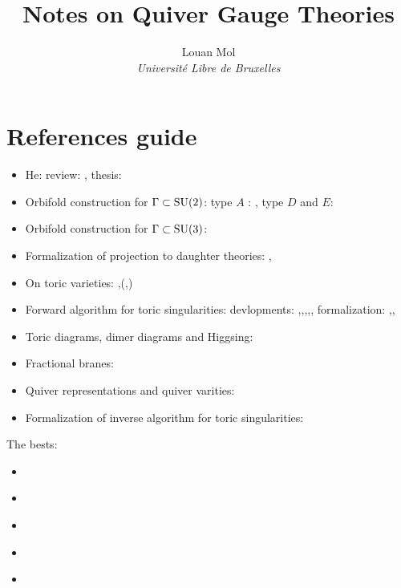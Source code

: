 \documentclass[a4paper,10pt]{article}
\title{\textbf{Notes on Quiver Gauge Theories}}
\author{Louan Mol\\ \textit{Université Libre de Bruxelles}}
\date{}
\begin{document}

  
\pagebreak

\tableofcontents

\pagebreak

\nocite{*}









\pagebreak
\appendix



\section{References guide}

\begin{itemize}
    \item He: review: \cite{he2004lectures}, thesis: \cite{masterHe}
    \item Orbifold construction for $\Gamma\subset\text{SU}(2)$: type $A$ : \cite{douglas1996dbranes}, type $D$ and $E$: \cite{PhysRevD.55.6382}
    \item Orbifold construction for $\Gamma\subset\text{SU}(3)$:\cite{Hanany_1999}
    \item Formalization of projection to daughter theories: \cite{vafa1998},\cite{silervstein1998}
    \item On toric varieties: \cite{cox2011toric},\cite{torigeomandCY}(\cite{fulton1993introduction},\cite{oda1988convex})
    \item Forward algorithm  for toric singularities: devlopments: \cite{FA1},\cite{FA2},\cite{FA3},\cite{FA4},\cite{FA5}, formalization: \cite{FA6},\cite{FA7},\cite{FA8}
    \item Toric diagrams, dimer diagrams and Higgsing: \cite{Argurio_20081}
    \item Fractional branes: \cite{Argurio_20082}
    \item Quiver representations and quiver varities: \cite{kirillov2016quiver}
    \item Formalization of inverse algorithm for toric singularities: \cite{Feng_2001}
\end{itemize}

The bests:
\begin{itemize}
    \item \cite{bertolinisusy}
    \item \cite{DbranespartI,DbranespartII}
    \item \cite{he2004lectures}
    \item \cite{brion}
    \item \cite{torigeomandCY}
\end{itemize}

\pagebreak

\listofmarker
{}

\pagebreak

\printbibliography
\end{document}
